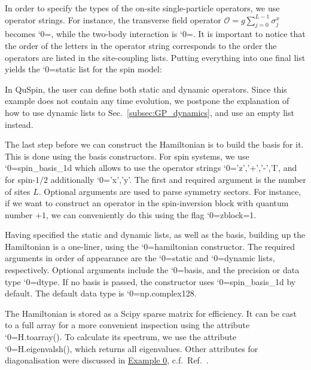 \documentclass{SciPost}
\newcommand\0{\scalebox{-1}[1]{0}}
\let\svttfamily\ttfamily
\renewcommand\ttfamily{\svttfamily\catcode`0=\active }
\renewcommand\texttt{\bgroup\ttfamily\texttthelp}
\def\texttthelp#1{#1\egroup}
\newcommand{\JWcode}{example6.py}
\begin{document}
In order to specify the types of the on-site single-particle operators, we use operator strings. For instance, the transverse field operator $\mathcal{O}=g\sum_{j=0}^{L-1}\sigma^x_j$ becomes \texttt{['x',h\_field]}, while the two-body interaction is \texttt{['zz',J\_zz]}. It is important to notice that the order of the letters in the operator string corresponds to the order the operators are listed in the site-coupling lists. Putting everything into one final list yields the \texttt{static} list for the spin model:  

In QuSpin, the user can define both static and dynamic operators. Since this example does not contain any time evolution, we postpone the explanation of how to use dynamic lists to Sec.~\ref{subsec:GP_dynamics}, and use an empty list instead.

The last step before we can construct the Hamiltonian is to build the basis for it. This is done using the basis constructors. For spin systems, we use \texttt{spin\_basis\_1d} which allows to use the operator strings \texttt{'z','+','-','I'}, and for spin-$1/2$ additionally \texttt{'x','y'}. The first and required argument is the number of sites $L$. Optional arguments are used to parse symmetry sectors. For instance, if we want to construct an operator in the spin-inversion block with quantum number $+1$, we can conveniently do this using the flag \texttt{zblock=1}.

Having specified the static and dynamic lists, as well as the basis, building up the Hamiltonian is a one-liner, using the \texttt{hamiltonian} constructor. The required arguments in order of appearance are the \texttt{static} and \texttt{dynamic} lists, respectively. Optional arguments include the \texttt{basis}, and the precision or data type \texttt{dtype}. If no basis is passed, the constructor uses \texttt{spin\_basis\_1d} by default. The default data type is \texttt{np.complex128}.
 
The Hamiltonian is stored as a Scipy sparse matrix for efficiency. It can be cast to a full array for a more convenient inspection using the attribute \texttt{H.toarray()}. To calculate its spectrum, we use the attribute \texttt{H.eigenvalsh()}, which returns all eigenvalues. Other attributes for diagonalisation were discussed in \href{https://github.com/weinbe58/QuSpin/blob/master/examples/scripts/example0.py}{Example 0}, c.f.~Ref.~\cite{weinberg_17_quspin}.
 
\end{document}
